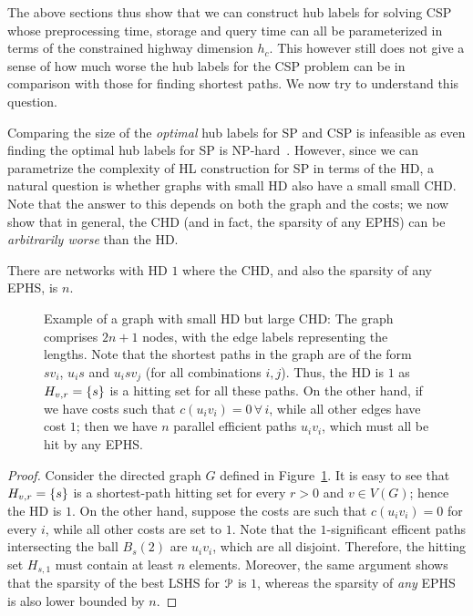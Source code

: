 The above sections thus show that we can construct hub labels for solving CSP whose preprocessing time, storage and query time can all be parameterized in terms of the constrained highway dimension $h_c$. 
This however still does not give a sense of how much worse the hub labels for the CSP problem can be in comparison with those for finding shortest paths. 
We now try to understand this question.

Comparing the size of the \emph{optimal} hub labels for SP and CSP is infeasible as even finding the optimal hub labels for SP is NP-hard~\cite{babenko_hl_complexity}. However, since we can parametrize the complexity of HL construction for SP in terms of the HD, a natural question is whether graphs with small HD also have a small small CHD. Note that the answer to this depends on both the graph and the costs; we now show that in general, the CHD (and in fact, the sparsity of any EPHS) can be \emph{arbitrarily worse} than the HD. 
\begin{proposition}
There are networks with HD $1$ where the CHD, and also the sparsity of any EPHS, is $n$.
\end{proposition}

\begin{figure}

\caption{Example of a graph with small HD but large CHD: The graph comprises $2n+1$ nodes, with the edge labels representing the lengths. Note that the shortest paths in the graph are of the form $sv_i$, $u_is$ and $u_isv_j$ (for all combinations $i,j$). Thus, the HD is $1$ as $H_{v,r}=\{s\}$ is a hitting set for all these paths. On the other hand, if we have costs such that $c(u_iv_i)=0\,\forall\,i$, while all other edges have cost $1$; then we have $n$ parallel efficient paths $u_iv_i$, which must all be hit by any EPHS.}
\label{fig:big_chd}
\end{figure}

\begin{proof}
Consider the directed graph $G$ defined in Figure~\ref{fig:big_chd}.
It is easy to see that $H_{v,r}=\{s\}$ is a shortest-path hitting set for every $r>0$ and $v\in V(G)$; hence the HD is $1$.
On the other hand, suppose the costs are such that $c(u_iv_i)=0$ for every $i$, while all other costs are set to $1$.
Note that the $1$-significant efficent paths intersecting the ball $B_s(2)$ are $u_iv_i$, which are all disjoint.
Therefore, the hitting set $H_{s,1}$ must contain at least $n$ elements. Moreover, the same argument shows that the sparsity of the best LSHS for $\mathcal{P}$ is $1$, whereas the sparsity of \emph{any} EPHS is also lower bounded by $n$.
\end{proof}

